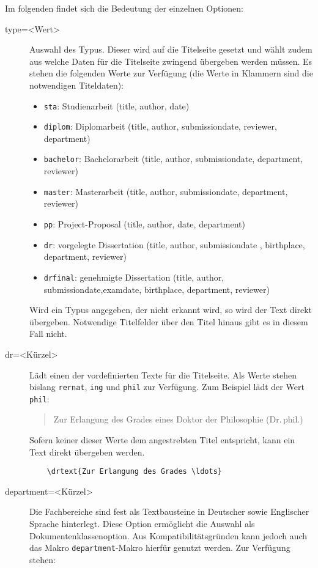 \documentclass[
	ngerman,
	ruledheaders=section,%
	class=report,%
	thesis={type=bachelor},%
	accentcolor=9c,%
	custommargins=true,%
	marginpar=false,%
	parskip=half-,%
	fontsize=11pt,%
]{tudapub}
\let\code\texttt
\begin{document}
Im folgenden findet sich die Bedeutung der einzelnen Optionen:
\begin{description}
\item[type=<Wert>] Auswahl des Typus. Dieser wird auf die Titelseite gesetzt und wählt zudem aus welche Daten für die Titelseite zwingend übergeben werden müssen.
	Es stehen die folgenden Werte zur Verfügung (die Werte in Klammern sind die notwendigen Titeldaten):
	\begin{itemize}
	\item \code{sta}: Studienarbeit (title, author, date)
	\item \code{diplom}: Diplomarbeit (title, author, submissiondate, reviewer, department)
	\item \code{bachelor}: Bachelorarbeit (title, author, submissiondate, department, reviewer)
	\item \code{master}: Masterarbeit (title, author, submissiondate, department, reviewer)
	\item \code{pp}: Project-Proposal  (title, author, date, department)
	\item \code{dr}: vorgelegte Dissertation (title, author, submissiondate , birthplace, department, reviewer)
	\item \code{drfinal}: genehmigte Dissertation (title, author, submissiondate,examdate, birthplace, department, reviewer)
	\end{itemize}
	Wird ein Typus angegeben, der nicht erkannt wird, so wird der Text direkt übergeben. Notwendige Titelfelder über den Titel hinaus gibt es in diesem Fall nicht.
\item[dr=<Kürzel>] Lädt einen der vordefinierten Texte für die Titelseite. Als Werte stehen bislang \code{rernat}, \code{ing} und \code{phil} zur Verfügung. Zum Beispiel lädt der Wert \code{phil}:
	\begin{quote}
	Zur Erlangung des Grades eines Doktor der Philosophie (Dr.\,phil.)
	\end{quote}
	Sofern keiner dieser Werte dem angestrebten Titel entspricht, kann ein Text direkt übergeben werden.
	\begin{verbatim}
	\drtext{Zur Erlangung des Grades \ldots}
	\end{verbatim}
\item[department=<Kürzel>] Die Fachbereiche sind fest als Textbausteine in Deutscher sowie Englischer Sprache hinterlegt. Diese Option ermöglicht die Auswahl als Dokumentenklassenoption. Aus Kompatibilitätsgründen kann jedoch auch das Makro \code{department}-Makro hierfür genutzt werden. Zur Verfügung stehen:\par

\end{description}
\end{document}
